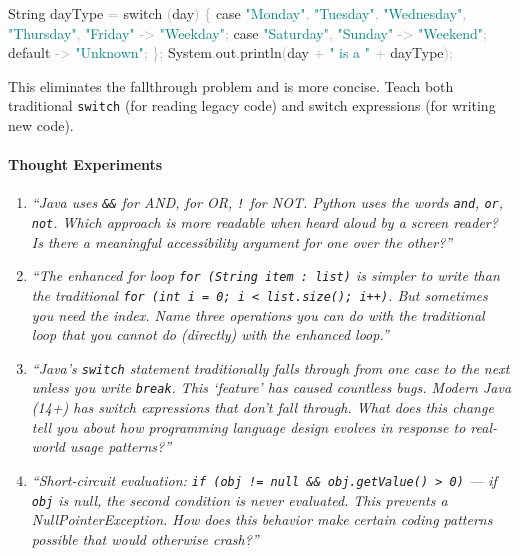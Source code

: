 \documentclass[
  justified,
  openright,
]{tufte-book}
\let\paragraph\paragraph
\newcommand{\BuiltInTok}[1]{#1}
\newcommand{\ControlFlowTok}[1]{\textcolor{BrandBlue}{#1}}
\newcommand{\FunctionTok}[1]{\textcolor{BrandBlue}{#1}}
\newcommand{\KeywordTok}[1]{\textcolor{BrandBlue}{#1}}
\newcommand{\NormalTok}[1]{#1}
\newcommand{\OperatorTok}[1]{\textcolor{DarkGray}{#1}}
\newcommand{\StringTok}[1]{\textcolor{Teal}{#1}}
\newenvironment{Shaded}{%
  \begin{snugshade}
}{%
  \end{snugshade}
}
\let\paragraph\paragraph
\begin{document}
\begin{Shaded}
\begin{Highlighting}[]
\BuiltInTok{String}\NormalTok{ dayType }\OperatorTok{=} \ControlFlowTok{switch} \OperatorTok{(}\NormalTok{day}\OperatorTok{)} \OperatorTok{\{}
    \ControlFlowTok{case} \StringTok{"Monday"}\OperatorTok{,} \StringTok{"Tuesday"}\OperatorTok{,} \StringTok{"Wednesday"}\OperatorTok{,} \StringTok{"Thursday"}\OperatorTok{,} \StringTok{"Friday"} \OperatorTok{{-}\textgreater{}} \StringTok{"Weekday"}\OperatorTok{;}
    \ControlFlowTok{case} \StringTok{"Saturday"}\OperatorTok{,} \StringTok{"Sunday"} \OperatorTok{{-}\textgreater{}} \StringTok{"Weekend"}\OperatorTok{;}
    \KeywordTok{default} \OperatorTok{{-}\textgreater{}} \StringTok{"Unknown"}\OperatorTok{;}
\OperatorTok{\};}
\BuiltInTok{System}\OperatorTok{.}\FunctionTok{out}\OperatorTok{.}\FunctionTok{println}\OperatorTok{(}\NormalTok{day }\OperatorTok{+} \StringTok{" is a "} \OperatorTok{+}\NormalTok{ dayType}\OperatorTok{);}
\end{Highlighting}
\end{Shaded}

This eliminates the fallthrough problem and is more concise. Teach both
traditional \texttt{switch} (for reading legacy code) and switch
expressions (for writing new code).

\paragraph{Thought Experiments}\label{thought-experiments-4}

\begin{enumerate}
\def\labelenumi{\arabic{enumi}.}
\item
  \emph{``Java uses \texttt{\&\&} for AND, \texttt{\textbar{}\textbar{}}
  for OR, \texttt{!} for NOT. Python uses the words \texttt{and},
  \texttt{or}, \texttt{not}. Which approach is more readable when heard
  aloud by a screen reader? Is there a meaningful accessibility argument
  for one over the other?''}
\item
  \emph{``The enhanced for loop \texttt{for\ (String\ item\ :\ list)} is
  simpler to write than the traditional
  \texttt{for\ (int\ i\ =\ 0;\ i\ \textless{}\ list.size();\ i++)}. But
  sometimes you need the index. Name three operations you can do with
  the traditional loop that you cannot do (directly) with the enhanced
  loop.''}
\item
  \emph{``Java's \texttt{switch} statement traditionally falls through
  from one case to the next unless you write \texttt{break}. This
  `feature' has caused countless bugs. Modern Java (14+) has switch
  expressions that don't fall through. What does this change tell you
  about how programming language design evolves in response to
  real-world usage patterns?''}
\item
  \emph{``Short-circuit evaluation:
  \texttt{if\ (obj\ !=\ null\ \&\&\ obj.getValue()\ \textgreater{}\ 0)}
  --- if \texttt{obj} is null, the second condition is never evaluated.
  This prevents a NullPointerException. How does this behavior make
  certain coding patterns possible that would otherwise crash?''}
\end{enumerate}
\end{document}
